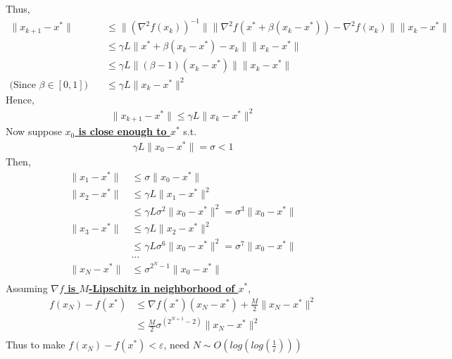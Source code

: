 \documentclass[11pt,a4paper]{article}
\begin{document}
Thus,
\begin{equation}
    \begin{aligned}
        \|x_{k+1}-x^*\|&\leq \|(\nabla^2 f(x_k))^{-1}\|\|\nabla^2 f(x^*+\beta(x_k-x^*))-\nabla^2 f(x_k)\|\|x_k-x^*\|\\
        &\leq \gamma L\|x^*+\beta(x_k-x^*)-x_k\|\|x_k-x^*\|\\
        &\leq \gamma L\|(\beta-1)(x_k-x^*)\|\|x_k-x^*\|\\
        \text{(Since $\beta\in [0,1]$)}\quad&\leq \gamma L\|x_k-x^*\|^2
    \end{aligned}
    \nonumber
\end{equation}
Hence,
\begin{equation}
    \begin{aligned}
        \|x_{k+1}-x^*\|\leq \gamma L\|x_k-x^*\|^2
    \end{aligned}
    \nonumber
\end{equation}
Now suppose \textbf{\underline{$x_0$ is close enough to $x^*$}} s.t.
\begin{equation}
    \begin{aligned}
        \gamma L\|x_0-x^*\|=\sigma<1
    \end{aligned}
    \nonumber
\end{equation}
Then,
\begin{equation}
    \begin{aligned}
        \|x_1-x^*\|&\leq \sigma\|x_0-x^*\|\\
        \|x_2-x^*\|&\leq \gamma L\|x_1-x^*\|^2\\
        &\leq \gamma L\sigma^2\|x_0-x^*\|^2=\sigma^3\|x_0-x^*\|\\
        \|x_3-x^*\|&\leq \gamma L\|x_2-x^*\|^2\\
        &\leq \gamma L\sigma^6\|x_0-x^*\|^2=\sigma^7\|x_0-x^*\|\\
        &\dots\\
        \|x_N-x^*\|&\leq \sigma^{2^N-1}\|x_0-x^*\|\\
    \end{aligned}
    \nonumber
\end{equation}
Assuming \textbf{\underline{$\nabla f$ is $M$-Lipschitz in neighborhood of $x^*$}},
\begin{equation}
    \begin{aligned}
        f(x_N)-f(x^*)&\leq \nabla f(x^*)(x_N-x^*)+\frac{M}{2}\|x_N-x^*\|^2\\
        &\leq \frac{M}{2}\sigma^{(2^{N+1}-2)}\|x_N-x^*\|^2\\
    \end{aligned}
    \nonumber
\end{equation}
Thus to make $f(x_N)-f(x^*)<\varepsilon$, need $N\sim O(log(log(\frac{1}{\varepsilon})))$
\end{document}
